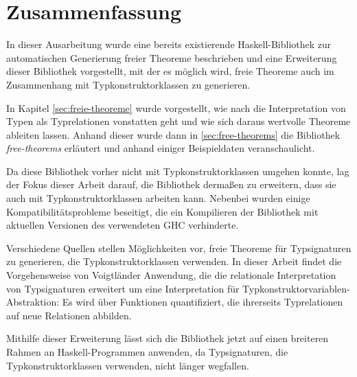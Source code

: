 \section{Zusammenfassung}

In dieser Ausarbeitung wurde eine bereits existierende Haskell-Bibliothek zur automatischen Generierung freier Theoreme
beschrieben und eine Erweiterung dieser Bibliothek vorgestellt, mit der es möglich wird, freie Theoreme auch im Zusammenhang
mit Typkonstruktorklassen zu generieren.

In Kapitel \ref{sec:freie-theoreme} wurde vorgestellt, wie nach \cite{wadler} die Interpretation von Typen als Typrelationen
vonstatten geht und wie sich daraus wertvolle Theoreme ableiten lassen. Anhand dieser wurde dann in \ref{sec:free-theorems}
die Bibliothek \textit{free-theorems} \cite{freetheorems} erläutert und anhand einiger Beispieldaten veranschaulicht.

Da diese Bibliothek vorher nicht mit Typkonstruktorklassen umgehen konnte, lag der Fokus dieser Arbeit darauf, die Bibliothek dermaßen
zu erweitern, dass sie auch mit Typkonstruktorklassen arbeiten kann. Nebenbei wurden einige Kompatibilitätsprobleme beseitigt,
die ein Kompilieren der Bibliothek mit aktuellen Versionen des verwendeten GHC \cite{ghc} verhinderte.

Verschiedene Quellen stellen Möglichkeiten vor, freie Theoreme für Typsignaturen zu generieren, die Typkonstruktorklassen
verwenden. In dieser Arbeit findet die Vorgehensweise von Voigtländer \cite{voigtlander} Anwendung, die die relationale Interpretation
von Typsignaturen erweitert um eine Interpretation für Typkonstruktorvariablen-Abstraktion: Es wird über Funktionen
quantifiziert, die ihrerseits Typrelationen auf neue Relationen abbilden.

Mithilfe dieser Erweiterung lässt sich die Bibliothek jetzt auf einen breiteren Rahmen an Haskell-Programmen anwenden, da
Typsignaturen, die Typkonstruktorklassen verwenden, nicht länger wegfallen.